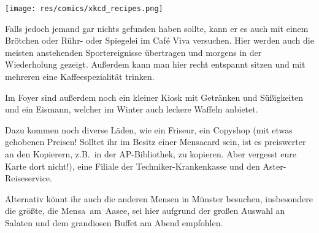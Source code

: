 \begin{multicols*}{2}
\texttt{[image: res/comics/xkcd\_recipes.png]}

Falls jedoch jemand gar nichts gefunden haben sollte, kann er es auch mit einem Brötchen oder Rühr- oder Spiegelei im Café Viva versuchen. Hier werden auch die meisten anstehenden Sportereignisse übertragen und morgens in der Wiederholung gezeigt. Außerdem kann man hier recht entspannt sitzen und mit mehreren eine Kaffeespezialität trinken.

Im Foyer sind außerdem noch ein kleiner Kiosk mit Getränken und Süßigkeiten und ein Eismann, welcher im Winter auch leckere Waffeln anbietet.

Dazu kommen noch diverse Läden, wie ein Friseur, ein Copyshop (mit etwas gehobenen Preisen! Solltet ihr im Besitz einer Mensacard sein, ist es preiswerter an den Kopierern, z.B.\ in der AP-Bibliothek, zu kopieren. Aber vergesst eure Karte dort nicht!), eine Filiale der Techniker-Krankenkasse und den Aster-Reiseservice.

Alternativ könnt ihr auch die anderen Mensen in Münster besuchen, insbesondere die größte, die Mensa~am~Aasee, sei hier aufgrund der großen Auswahl an Salaten und dem grandiosen Buffet am Abend empfohlen. 

\end{multicols*}
